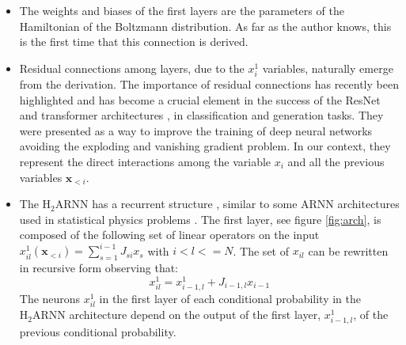 \documentclass[aps,physrev,10pt,floatfix,reprint]{revtex4-2}
\begin{document}
\begin{itemize}
    \item 
    The weights and biases of the first layers are the parameters of the Hamiltonian of the Boltzmann distribution. 
    As far as the author knows, this is the first time that this connection is derived.
    \item Residual connections among layers, due to the $x_i^1$ variables, naturally emerge from the derivation. 
    The importance of residual connections has recently been highlighted  \cite{10.48550/arxiv.1512.03385} and has become a crucial element in the success of the ResNet and transformer architectures \cite{vaswani2017attention}, in classification and generation tasks. They were presented as a way to improve the training of deep neural networks avoiding the exploding and vanishing gradient problem. In our context, they represent the direct interactions among the variable $x_i$ and all the previous variables $\mathbf{x}_{<i}$. 

    \item The $\text{H}_2\text{ARNN}$ has a recurrent structure  \cite{bengioNatureDeepLearning2015, https://doi.org/10.48550/arxiv.1506.00019}, similar to some ARNN architectures used in statistical physics problems \cite{10.1038/s42256-021-00401-3, PhysRevResearch.2.023358}. 
    The first layer, see figure \ref{fig:arch}, is composed of the following set of linear operators on the input $x^1_{il}(\mathbf{x}_{<i})=\sum_{s=1}^{i-1} J_{si} x_s$ with $i<l<=N$. The set of $x_{il}$ can be rewritten in recursive form observing that:
    \begin{equation}
        x^1_{il} = x^1_{i-1,l} + J_{i-1,l} x_{i-1}
    \end{equation}
    The neurons $x^1_{il}$ in the first layer of each conditional probability in the $\text{H}_2\text{ARNN}$ architecture depend on the output of the first layer, $x^1_{i-1,l}$, of the previous conditional probability.
\end{itemize}
\end{document}
